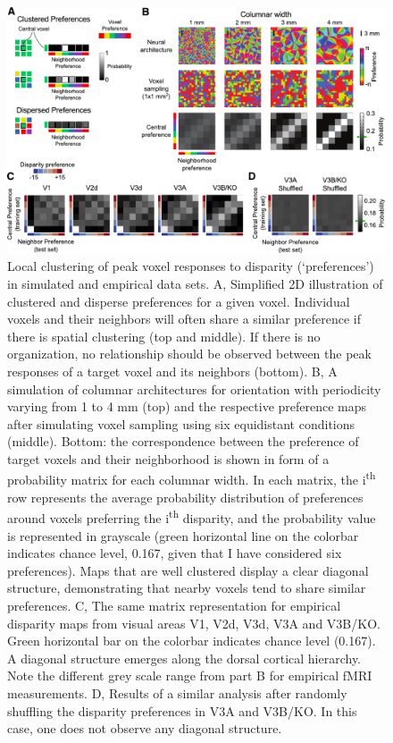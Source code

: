 \begin{figure}
  \centering
  \includegraphics[width=14cm, keepaspectratio]{fig3}
  \caption[Local clustering of peak voxel responses to disparity.]{Local clustering of peak voxel responses to disparity (`preferences') in simulated and empirical data sets. A, Simplified 2D illustration of clustered and disperse preferences for a given voxel. Individual voxels and their neighbors will often share a similar preference if there is spatial clustering (top and middle). If there is no organization, no relationship should be observed between the peak responses of a target voxel and its neighbors (bottom). B, A simulation of columnar architectures for orientation \cite{ROJER:1990bq} with periodicity varying from 1 to 4 mm (top) and the respective preference maps after simulating voxel sampling using six equidistant conditions (middle). Bottom: the correspondence between the preference of target voxels and their neighborhood is shown in form of a probability matrix for each columnar width. In each matrix, the i\textsuperscript{th} row represents the average probability distribution of preferences around voxels preferring the i\textsuperscript{th} disparity, and the probability value is represented in grayscale (green horizontal line on the colorbar indicates chance level, 0.167, given that I have considered six preferences). Maps that are well clustered display a clear diagonal structure, demonstrating that nearby voxels tend to share similar preferences. C, The same matrix representation for empirical disparity maps from visual areas V1, V2d, V3d, V3A and V3B/KO. Green horizontal bar on the colorbar indicates chance level (0.167). A diagonal structure emerges along the dorsal cortical hierarchy. Note the different grey scale range from part B for empirical fMRI measurements. D, Results of a similar analysis after randomly shuffling the disparity preferences in V3A and V3B/KO. In this case, one does not observe any diagonal structure.}
  \label{fig:ch4fig3}
\end{figure}

